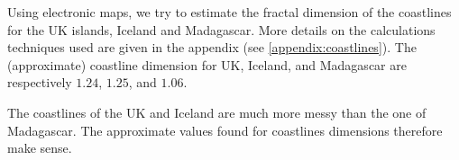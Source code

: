 Using electronic maps, we try to estimate the fractal dimension of the coastlines for the UK islands, Iceland and Madagascar.
More details on the calculations techniques used are given in the appendix (see \ref{appendix:coastlines}).
The (approximate) coastline dimension for UK, Iceland, and Madagascar are respectively $1.24$, $1.25$, and $1.06$.

The coastlines of the UK and Iceland are much more messy than the one of Madagascar.
The approximate values found for coastlines dimensions therefore make sense.
